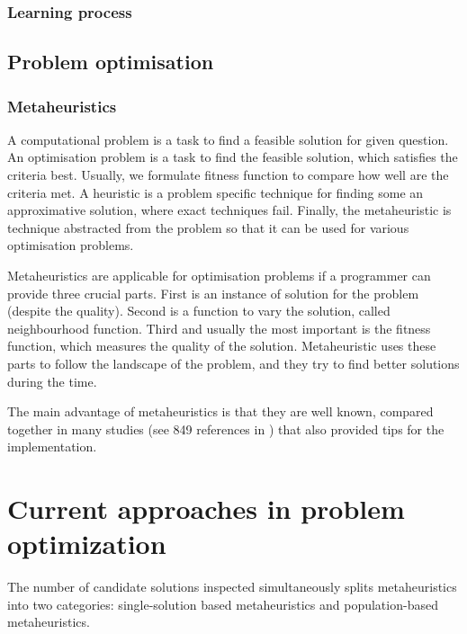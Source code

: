 \documentclass[
  print, %
  Table,   %
  nolof,     %
  nolot,     %
  11pt, %
  oneside  %
]{fithesis3}
\begin{document}
\subsection{Learning process}
\label{subsec:eac-learning}


\section{Problem optimisation}
\label{sec:prob-opt}

\subsection{Metaheuristics}
\label{subsec:prob-opt-meta}

A computational problem is a task to find a feasible solution for given question. An optimisation problem is a task to find the feasible solution, which satisfies the criteria best. Usually, we formulate fitness function to compare how well are the criteria met. A heuristic is a problem specific technique for finding some an approximative solution, where exact techniques fail. Finally, the metaheuristic is technique abstracted from the problem so that it can be used for various optimisation problems.

Metaheuristics are applicable for optimisation problems if a programmer can provide three crucial parts. First is an instance of solution for the problem (despite the quality). Second is a function to vary the solution, called neighbourhood function. Third and usually the most important is the fitness function, which measures the quality of the solution. Metaheuristic uses these parts to follow the landscape of the problem, and they try to find better solutions during the time.

The main advantage of metaheuristics is that they are well known, compared together in many studies (see 849 references in \cite{talbi2009metaheuristics}) that also provided tips for the implementation.

\chapter{Current approaches in problem optimization}
\label{chap:optimisation}

The number of candidate solutions inspected simultaneously splits metaheuristics into two categories: single-solution based metaheuristics and population-based metaheuristics.
\end{document}
